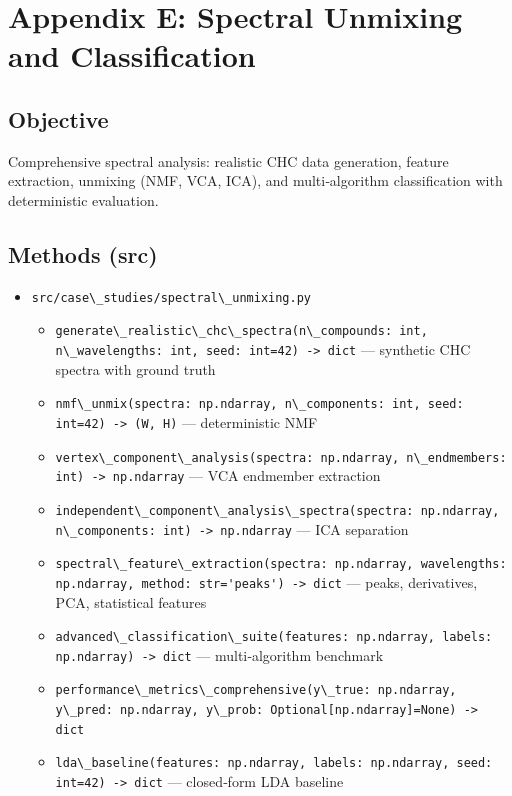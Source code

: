 \documentclass[
  13pt,
  a4paperpaper,
  12pt]{article}
\author{}
\date{}
\newcommand{\passthrough}[1]{#1}
\providecommand{\tightlist}{%
  \setlength{\itemsep}{0pt}\setlength{\parskip}{0pt}}
\let\oldsection\section
\renewcommand{\section}{\clearpage\oldsection}
\begin{document}
{
\hypersetup{linkcolor=black}
\setcounter{tocdepth}{3}
\tableofcontents
}
\section{Appendix E: Spectral Unmixing and
Classification}\label{sec:app_spectral_unmixing}

\subsection{Objective}\label{objective}

Comprehensive spectral analysis: realistic CHC data generation, feature
extraction, unmixing (NMF, VCA, ICA), and multi‑algorithm classification
with deterministic evaluation.

\subsection{Methods (src)}\label{methods-src}

\begin{itemize}
\tightlist
\item
  \passthrough{\lstinline!src/case\_studies/spectral\_unmixing.py!}

  \begin{itemize}
  \tightlist
  \item
    \passthrough{\lstinline!generate\_realistic\_chc\_spectra(n\_compounds: int, n\_wavelengths: int, seed: int=42) -> dict!}
    --- synthetic CHC spectra with ground truth
  \item
    \passthrough{\lstinline!nmf\_unmix(spectra: np.ndarray, n\_components: int, seed: int=42) -> (W, H)!}
    --- deterministic NMF
  \item
    \passthrough{\lstinline!vertex\_component\_analysis(spectra: np.ndarray, n\_endmembers: int) -> np.ndarray!}
    --- VCA endmember extraction
  \item
    \passthrough{\lstinline!independent\_component\_analysis\_spectra(spectra: np.ndarray, n\_components: int) -> np.ndarray!}
    --- ICA separation
  \item
    \passthrough{\lstinline!spectral\_feature\_extraction(spectra: np.ndarray, wavelengths: np.ndarray, method: str='peaks') -> dict!}
    --- peaks, derivatives, PCA, statistical features
  \item
    \passthrough{\lstinline!advanced\_classification\_suite(features: np.ndarray, labels: np.ndarray) -> dict!}
    --- multi‑algorithm benchmark
  \item
    \passthrough{\lstinline!performance\_metrics\_comprehensive(y\_true: np.ndarray, y\_pred: np.ndarray, y\_prob: Optional[np.ndarray]=None) -> dict!}
  \item
    \passthrough{\lstinline!lda\_baseline(features: np.ndarray, labels: np.ndarray, seed: int=42) -> dict!}
    --- closed‑form LDA baseline
  \end{itemize}
\end{itemize}
\end{document}
